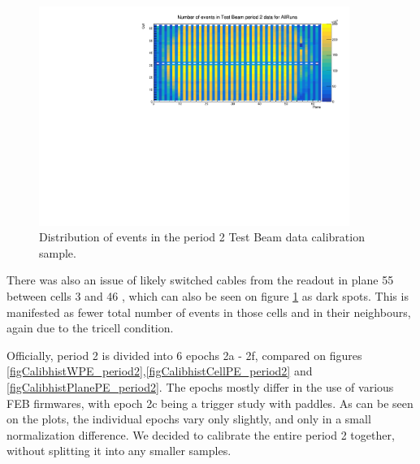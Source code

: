 \documentclass[12pt,a4paper]{article}
\begin{document}
\begin{figure}[h]
\centering
\includegraphics[width=0.9\textwidth]{Plots/Attenprofs_P2Data_CellPlane_AllRuns.pdf}
\caption{Distribution of events in the period 2 Test Beam data calibration sample.}
\label{figCalibhist_period2}
\end{figure}

There was also an issue of likely switched cables from the readout in plane 55 between cells 3 and 46 \cite{NOVA-doc-49674}, which can also be seen on figure \ref{figCalibhist_period2} as dark spots. This is manifested as fewer total number of events in those cells and in their neighbours, again due to the tricell condition.

Officially, period 2 is divided into 6 epochs 2a - 2f, compared on figures \ref{figCalibhistWPE_period2},\ref{figCalibhistCellPE_period2} and \ref{figCalibhistPlanePE_period2}. The epochs mostly differ in the use of various FEB firmwares, with epoch 2c being a trigger study with paddles. As can be seen on the plots, the individual epochs vary only slightly, and only in a small normalization difference. We decided to calibrate the entire period 2 together, without splitting it into any smaller samples.
\end{document}
